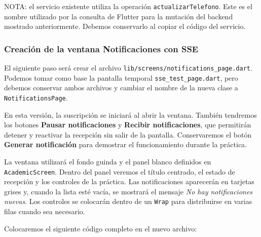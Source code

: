 NOTA: el servicio existente utiliza la operación \texttt{actualizarTelefono}. Este es el nombre utilizado por la consulta de Flutter para la mutación del backend mostrado anteriormente. Debemos conservarlo al copiar el código del servicio.

\subsubsection{Creación de la ventana Notificaciones con SSE}
El siguiente paso será crear el archivo \texttt{lib/screens/notifications\_page.dart}. Podemos tomar como base la pantalla temporal \texttt{sse\_test\_page.dart}, pero debemos conservar ambos archivos y cambiar el nombre de la nueva clase a \texttt{NotificationsPage}.

En esta versión, la suscripción se iniciará al abrir la ventana. También tendremos los botones \textbf{Pausar notificaciones} y \textbf{Recibir notificaciones}, que permitirán detener y reactivar la recepción sin salir de la pantalla. Conservaremos el botón \textbf{Generar notificación} para demostrar el funcionamiento durante la práctica.

La ventana utilizará el fondo guinda y el panel blanco definidos en \texttt{AcademicScreen}. Dentro del panel veremos el título centrado, el estado de recepción y los controles de la práctica. Las notificaciones aparecerán en tarjetas grises y, cuando la lista esté vacía, se mostrará el mensaje \textit{No hay notificaciones nuevas}. Los controles se colocarán dentro de un \texttt{Wrap} para distribuirse en varias filas cuando sea necesario.

Colocaremos el siguiente código completo en el nuevo archivo:

